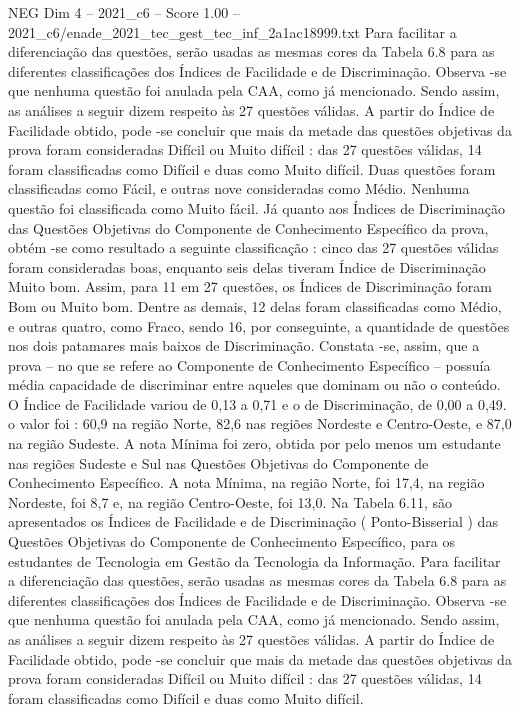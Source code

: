 \begin{textsample}{NEG Dim 4 – 2021\_c6 – Score 1.00 – 2021\_c6/enade\_2021\_tec\_gest\_tec\_inf\_2a1ac18999.txt}
Para facilitar a diferenciação das questões, serão usadas as mesmas cores da Tabela 6.8 para as diferentes classificações dos Índices de Facilidade e de Discriminação.
Observa -se que nenhuma questão foi anulada pela CAA, como já mencionado.
Sendo assim, as análises a seguir dizem respeito às 27 questões válidas.
A partir do Índice de Facilidade obtido, pode -se concluir que mais da metade das questões objetivas da prova foram consideradas Difícil ou Muito difícil : das 27 questões válidas, 14 foram classificadas como Difícil e duas como Muito difícil.
Duas questões foram classificadas como Fácil, e outras nove consideradas como Médio.
Nenhuma questão foi classificada como Muito fácil.
Já quanto aos Índices de Discriminação das Questões Objetivas do Componente de Conhecimento Específico da prova, obtém -se como resultado a seguinte classificação : cinco das 27 questões válidas foram consideradas boas, enquanto seis delas tiveram Índice de Discriminação Muito bom.
Assim, para 11 em 27 questões, os Índices de Discriminação foram Bom ou Muito bom.
Dentre as demais, 12 delas foram classificadas como Médio, e outras quatro, como Fraco, sendo 16, por conseguinte, a quantidade de questões nos dois patamares mais baixos de Discriminação.
Constata -se, assim, que a prova – no que se refere ao Componente de Conhecimento Específico – possuía média capacidade de discriminar entre aqueles que dominam ou não o conteúdo.
O Índice de Facilidade variou de 0,13 a 0,71 e o de Discriminação, de 0,00 a 0,49. o valor foi : 60,9 na região Norte, 82,6 nas regiões Nordeste e Centro-Oeste, e 87,0 na região Sudeste.
A nota Mínima foi zero, obtida por pelo menos um estudante nas regiões Sudeste e Sul nas Questões Objetivas do Componente de Conhecimento Específico.
A nota Mínima, na região Norte, foi 17,4, na região Nordeste, foi 8,7 e, na região Centro-Oeste, foi 13,0.
Na Tabela 6.11, são apresentados os Índices de Facilidade e de Discriminação ( Ponto-Bisserial ) das Questões Objetivas do Componente de Conhecimento Específico, para os estudantes de Tecnologia em Gestão da Tecnologia da Informação.
Para facilitar a diferenciação das questões, serão usadas as mesmas cores da Tabela 6.8 para as diferentes classificações dos Índices de Facilidade e de Discriminação.
Observa -se que nenhuma questão foi anulada pela CAA, como já mencionado.
Sendo assim, as análises a seguir dizem respeito às 27 questões válidas.
A partir do Índice de Facilidade obtido, pode -se concluir que mais da metade das questões objetivas da prova foram consideradas Difícil ou Muito difícil : das 27 questões válidas, 14 foram classificadas como Difícil e duas como Muito difícil.

\end{textsample}

